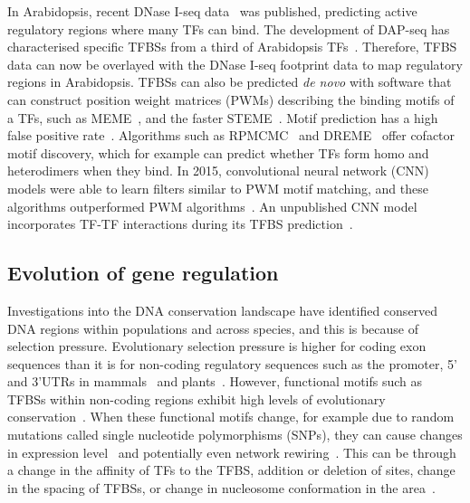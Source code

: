 \documentclass[../main.tex]{subfiles}
\begin{document}
In Arabidopsis, recent DNase I\hyp{}seq data~\autocite{sullivanMappingDynamicsRegulatory2014} was published, predicting active regulatory regions where many TFs can bind.
The development of DAP\hyp{}seq has characterised specific TFBSs from a third of Arabidopsis TFs~\autocite{omalleyCistromeEpicistromeFeatures2016}.
Therefore, TFBS data can now be overlayed with the DNase I\hyp{}seq footprint data to map regulatory regions in Arabidopsis.
TFBSs can also be predicted \textit{de novo} with software that can construct position weight matrices (PWMs) describing the binding motifs of a TFs, such as MEME~\autocite{baileyFittingMixtureModel1994}, and the faster STEME~\autocite{reidSTEMEEfficientEM2011}.
Motif prediction has a high false positive rate~\autocite{zambelliMotifDiscoveryTranscription2013}.
Algorithms such as RPMCMC~\autocite{ikebataRepulsiveParallelMCMC2015} and DREME~\autocite{baileyDREMEMotifDiscovery2011} offer cofactor motif discovery, which for example can predict whether TFs form homo and heterodimers when they bind.
In 2015, convolutional neural network (CNN) models were able to learn filters similar to PWM motif matching, and these algorithms outperformed PWM algorithms~\autocite{alipanahiPredictingSequenceSpecificities2015}.
An unpublished CNN model incorporates TF\hyp{}TF interactions during its TFBS prediction~\autocite{lanchantinPrototypeMatchingNetworks2017}.

\subsection{Evolution of gene regulation}
{\label{chapter1:evolution-of-gene-regulation}}

Investigations into the DNA conservation landscape have identified
conserved DNA regions within populations and across species, and this is
because of selection pressure. Evolutionary selection pressure is higher
for coding exon sequences than it is for non\hyp{}coding regulatory sequences
such as the promoter, 5' and 3'UTRs in mammals~\autocite{lindblad-tohHighresolutionMapHuman2011} and
plants~\autocite{haudryAtlas900002013}. However, functional motifs such as TFBSs
within non\hyp{}coding regions exhibit high levels of evolutionary
conservation~\autocite{zhaoConservedMotifsPrediction2012}. When these functional motifs change,
for example due to random mutations called single nucleotide
polymorphisms (SNPs), they can cause changes in expression
level~\autocite{rockmanAbundantRawMaterial2002} and potentially even network
rewiring~\autocite{liEvolutionTranscriptionNetworks2010}. This can be through a change in the
affinity of TFs to the TFBS, addition or deletion of sites, change in
the spacing of TFBSs, or change in nucleosome conformation in the area~\autocite{fyonEnhancerRunawayEvolution2015}.
\end{document}

